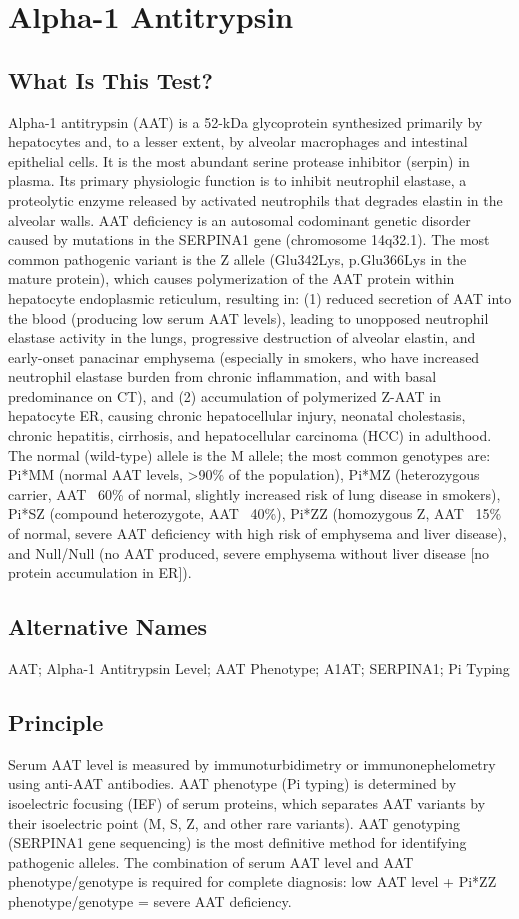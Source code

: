 \chapter{Alpha-1 Antitrypsin}
\section*{What Is This Test?}
Alpha-1 antitrypsin (AAT) is a 52-kDa glycoprotein synthesized primarily by hepatocytes and, to a lesser extent, by alveolar macrophages and intestinal epithelial cells. It is the most abundant serine protease inhibitor (serpin) in plasma. Its primary physiologic function is to inhibit neutrophil elastase, a proteolytic enzyme released by activated neutrophils that degrades elastin in the alveolar walls. AAT deficiency is an autosomal codominant genetic disorder caused by mutations in the SERPINA1 gene (chromosome 14q32.1). The most common pathogenic variant is the Z allele (Glu342Lys, p.Glu366Lys in the mature protein), which causes polymerization of the AAT protein within hepatocyte endoplasmic reticulum, resulting in: (1) reduced secretion of AAT into the blood (producing low serum AAT levels), leading to unopposed neutrophil elastase activity in the lungs, progressive destruction of alveolar elastin, and early-onset panacinar emphysema (especially in smokers, who have increased neutrophil elastase burden from chronic inflammation, and with basal predominance on CT), and (2) accumulation of polymerized Z-AAT in hepatocyte ER, causing chronic hepatocellular injury, neonatal cholestasis, chronic hepatitis, cirrhosis, and hepatocellular carcinoma (HCC) in adulthood. The normal (wild-type) allele is the M allele; the most common genotypes are: Pi*MM (normal AAT levels, >90\% of the population), Pi*MZ (heterozygous carrier, AAT ~60\% of normal, slightly increased risk of lung disease in smokers), Pi*SZ (compound heterozygote, AAT ~40\%), Pi*ZZ (homozygous Z, AAT ~15\% of normal, severe AAT deficiency with high risk of emphysema and liver disease), and Null/Null (no AAT produced, severe emphysema without liver disease [no protein accumulation in ER]).
\section*{Alternative Names}
AAT; Alpha-1 Antitrypsin Level; AAT Phenotype; A1AT; SERPINA1; Pi Typing
\section*{Principle}
Serum AAT level is measured by immunoturbidimetry or immunonephelometry using anti-AAT antibodies. AAT phenotype (Pi typing) is determined by isoelectric focusing (IEF) of serum proteins, which separates AAT variants by their isoelectric point (M, S, Z, and other rare variants). AAT genotyping (SERPINA1 gene sequencing) is the most definitive method for identifying pathogenic alleles. The combination of serum AAT level and AAT phenotype/genotype is required for complete diagnosis: low AAT level + Pi*ZZ phenotype/genotype = severe AAT deficiency.
